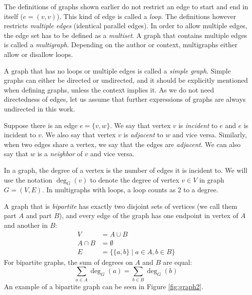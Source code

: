 The definitions of graphs shown earlier do not restrict an edge to start and end in itself ($e=(v, v)$).
This kind of edge is called a \emph{loop}.
The definitions however restricts \emph{multiple edges} (identical parallel edges).
In order to allow multiple edges, the edge set has to be defined as a \emph{multiset}.
A graph that contains multiple edges is called a \emph{multigraph}.
Depending on the author or context, multigraphs either allow or disallow loops.

A graph that has no loops or multiple edges is called a \emph{simple graph}.
Simple graphs can either be directed or undirected, and it should be explicitly mentioned when defining graphs, unless the context implies it.
As we do not need directedness of edges, let us assume that further expressions of graphs are always undirected in this work.

Suppose there is an edge $e=\{v,w\}$.
We say that vertex $v$ is \emph{incident} to $e$ and $e$ is incident to $v$.
We also say that vertex $v$ is \emph{adjacent} to $w$ and vice versa.
Similarly, when two edges share a vertex, we say that the edges are \emph{adjacent}.
We can also say that $w$ is a \emph{neighbor} of $v$ and vice versa.

In a graph, the degree of a vertex is the number of edges it is incident to.
We will use the notation $\deg_G(v)$ to denote the degree of vertex $v \in V$ in graph $G=(V,E)$.
In multigraphs with loops, a loop counts as 2 to a degree.

A graph that is \emph{bipartite} has exactly two disjoint sets of vertices (we call them part $A$ and part $B$), and every edge of the graph has one endpoint in vertex of $A$ and another in $B$:
\begin{align}
V &= A \cup B\\
A \cap B &= \emptyset\\
E &=\{\{a, b\} \mid a \in A, b \in B\}
\end{align}
For bipartite graphs, the sum of degrees on $A$ and $B$ are equal:
\begin{equation}
\sum_{a\in A} \deg_G(a) = \sum_{b\in B} \deg_G(b)
\end{equation}
An example of a bipartite graph can be seen in Figure \ref{fig:graph2}.

